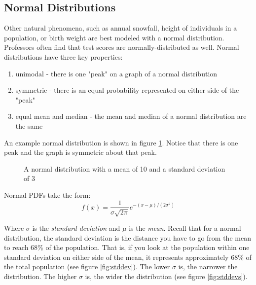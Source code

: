 \subsection{Normal Distributions}
Other natural phenomena, such as annual snowfall, height of individuals in a 
population, or birth weight are best modeled with a normal distribution. 
Professors often find that test scores are normally-distributed as well. 
Normal distributions have three key properties:
\begin{enumerate}
\item unimodal - there is one "peak" on a graph of a normal distribution
\item symmetric - there is an equal probability represented on either side of 
the "peak"
\item equal mean and median - the mean and median of a normal distribution are 
the same
\end{enumerate}

An example normal distribution is shown in figure \ref{fig:normal}. Notice 
that there is one peak and the graph is symmetric about that peak. 

\begin{figure}[htbp]
	\centering
    \label{fig:normal}
    \caption{A normal distribution with a mean of 10 and a standard deviation 
    of 3}
\end{figure}

Normal PDFs take the form:
$$f(x) = \frac{1}{\sigma \sqrt{2\pi}} e^{-\left(x - \mu \right)/\left(2 
\sigma^2 \right)}$$

Where $\sigma$ is the \textit{standard deviation} 
and $\mu$ is the \textit{mean}. Recall that for a normal 
distribution, the standard deviation is the distance you have to go from the 
mean to reach 68\% of the population. That is, if you look at the population 
within one standard deviation on either side of the mean, it represents 
approximately 68\% of the total population (see figure \ref{fig:stddev}). The 
lower $\sigma$ is, the narrower the distribution. The higher $\sigma$ is, the 
wider the distribution (see figure \ref{fig:stddevs}). 

